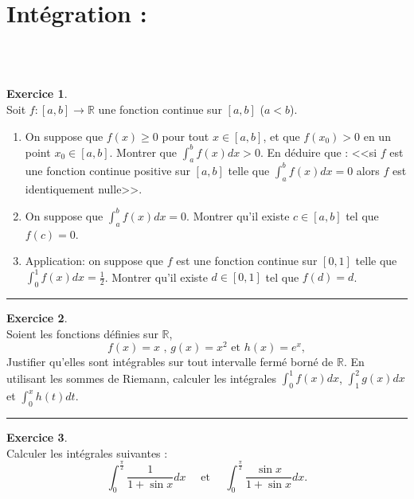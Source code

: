 \documentclass[a4paper,10pt]{article}
\theoremstyle{definition}
\theoremstyle{definition}
\newtheorem{exo}{Exercice}
\newcommand{\R}{\mathbb{R}}
\begin{document}
\section*{Intégration :}\hfill\\\hfill\\
\begin{minipage}{1\linewidth}
	\begin{minipage}[t]{0.48\linewidth}
		\raggedright
		
		
		
		\begin{exo}\quad\\
			Soit $f:[a,b]\rightarrow \R$ une fonction continue sur $[a,b]$ ($a<b$).
			\begin{enumerate}
				\item On suppose que $f(x) \ge 0$ pour tout $x\in [a,b]$, et que $f(x_0)>0$ en un point $x_0\in [a,b]$. 
				Montrer que $\int_a^b f(x) d x>0$. En déduire que : <<si $f$ est une fonction continue
				positive sur $[a,b]$ telle que $\int_a^b f(x) d x=0$ alors $f$ est
				identiquement nulle>>.
				\item On suppose que $\int_a^b f(x) d x=0$. Montrer qu'il existe $c\in [a,b]$ tel que $f(c)=0$. 
				\item Application: on suppose
				que $f$ est une fonction continue sur $[0,1]$ telle que $\int_0^1 f(x) dx=\frac 12$. 
				Montrer qu'il existe $d\in [0,1]$ tel que $f(d)=d$.
			\end{enumerate}
			
			\centering
			\rule{1\linewidth}{0.6pt}
		\end{exo}
		
		
		
		\begin{exo}\quad\\
			Soient les fonctions définies sur $\R$,
			$$f(x)=x \text{ , } g(x)=x^2 \text{ et  } h(x)=e^x,$$
			Justifier qu'elles sont intégrables sur tout intervalle fermé borné de $\R$. En utilisant les
			sommes de Riemann, calculer les intégrales $\int_0^1f(x)d x$, $\int_1^2 g(x)
			d x$ et $\int_0^x h(t) d t$.
			
			\centering
			\rule{1\linewidth}{0.6pt}
		\end{exo}
		
				\begin{exo}\quad\\
			Calculer les intégrales suivantes :
			$$\int_0^{\frac \pi 2}\frac 1{1+\sin x}d x \quad \mbox{ et } \quad \int_0^{\frac \pi 2}\frac{\sin
				x}{1+\sin x}d x.$$
			

\end{exo}
\end{minipage}
\end{minipage}
\end{document}
